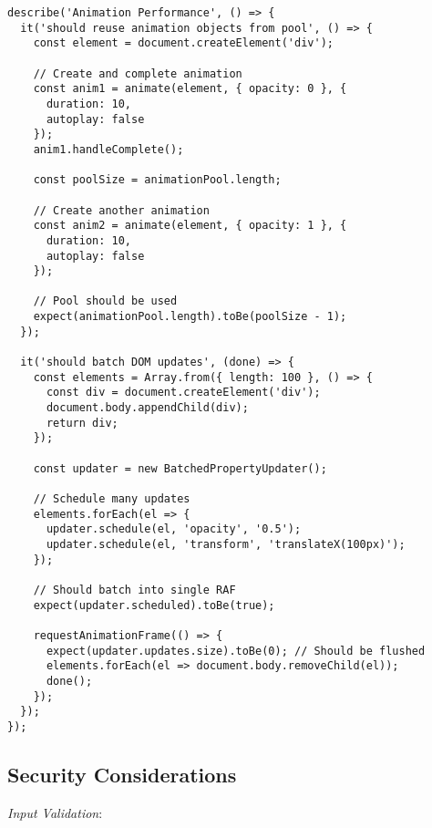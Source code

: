 \documentclass[11pt]{article}
\begin{document}
\begin{verbatim}
describe('Animation Performance', () => {
  it('should reuse animation objects from pool', () => {
    const element = document.createElement('div');
    
    // Create and complete animation
    const anim1 = animate(element, { opacity: 0 }, { 
      duration: 10,
      autoplay: false 
    });
    anim1.handleComplete();
    
    const poolSize = animationPool.length;
    
    // Create another animation
    const anim2 = animate(element, { opacity: 1 }, {
      duration: 10,
      autoplay: false
    });
    
    // Pool should be used
    expect(animationPool.length).toBe(poolSize - 1);
  });
  
  it('should batch DOM updates', (done) => {
    const elements = Array.from({ length: 100 }, () => {
      const div = document.createElement('div');
      document.body.appendChild(div);
      return div;
    });
    
    const updater = new BatchedPropertyUpdater();
    
    // Schedule many updates
    elements.forEach(el => {
      updater.schedule(el, 'opacity', '0.5');
      updater.schedule(el, 'transform', 'translateX(100px)');
    });
    
    // Should batch into single RAF
    expect(updater.scheduled).toBe(true);
    
    requestAnimationFrame(() => {
      expect(updater.updates.size).toBe(0); // Should be flushed
      elements.forEach(el => document.body.removeChild(el));
      done();
    });
  });
});
\end{verbatim}
\subsection{Security Considerations}
\label{sec:org96785c3}

\emph{Input Validation}:
\end{document}

